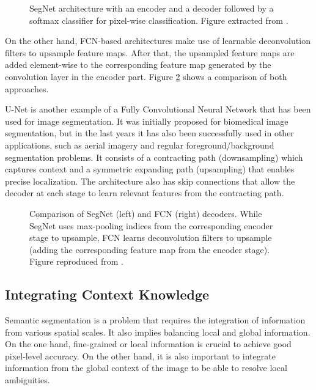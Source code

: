 \begin{figure}[!hbt]
	\caption{SegNet architecture with an encoder and a decoder followed by a softmax classifier for pixel-wise classification. Figure extracted from \cite{Badrinarayanan2015}.}
	\label{fig:segnet}
\end{figure}

On the other hand, \acs{FCN}-based architectures make use of learnable deconvolution filters to upsample feature maps. After that, the upsampled feature maps are added element-wise to the corresponding feature map generated by the convolution layer in the encoder part. Figure \ref{fig:segnetvsfcn} shows a comparison of both approaches.

U-Net \cite{Ronneberger2015} is another example of a Fully Convolutional Neural Network that has been used for image segmentation. It was initially proposed for biomedical image segmentation, but in the last years it has also been successfully used in other applications, such as aerial imagery \cite{Zhang2017} and regular foreground/background segmentation problems. It consists of a contracting path (downsampling) which captures context and a symmetric expanding path (upsampling) that enables precise localization. The architecture also has skip connections that allow the decoder at each stage to learn relevant features from the contracting path.

\begin{figure}[!hbt]
	\caption{Comparison of SegNet (left) and \acs{FCN} (right) decoders. While SegNet uses max-pooling indices from the corresponding encoder stage to upsample, \acs{FCN} learns deconvolution filters to upsample (adding the corresponding feature map from the encoder stage). Figure reproduced from \cite{Badrinarayanan2015}.}
	\label{fig:segnetvsfcn}
\end{figure}

\subsection{Integrating Context Knowledge}

Semantic segmentation is a problem that requires the integration of information from various spatial scales. It also implies balancing local and global information. On the one hand, fine-grained or local information is crucial to achieve good pixel-level accuracy. On the other hand, it is also important to integrate information from the global context of the image to be able to resolve local ambiguities.

